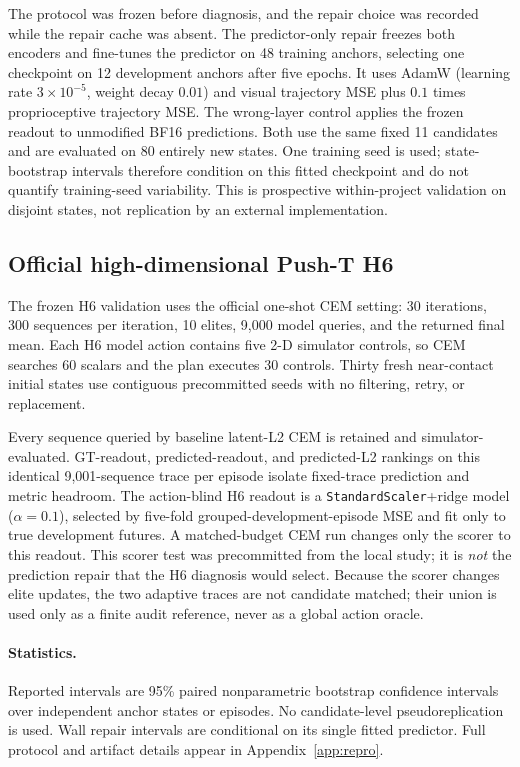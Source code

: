 The protocol was frozen before diagnosis, and the repair choice was recorded while the repair cache was absent. The predictor-only repair freezes both encoders and fine-tunes the predictor on 48 training anchors, selecting one checkpoint on 12 development anchors after five epochs. It uses AdamW (learning rate $3\times10^{-5}$, weight decay $0.01$) and visual trajectory MSE plus $0.1$ times proprioceptive trajectory MSE. The wrong-layer control applies the frozen readout to unmodified BF16 predictions. Both use the same fixed 11 candidates and are evaluated on 80 entirely new states. One training seed is used; state-bootstrap intervals therefore condition on this fitted checkpoint and do not quantify training-seed variability. This is prospective within-project validation on disjoint states, not replication by an external implementation.

\subsection{Official high-dimensional Push-T H6}

The frozen H6 validation uses the official one-shot CEM setting: 30 iterations, 300 sequences per iteration, 10 elites, 9,000 model queries, and the returned final mean. Each H6 model action contains five 2-D simulator controls, so CEM searches 60 scalars and the plan executes 30 controls. Thirty fresh near-contact initial states use contiguous precommitted seeds with no filtering, retry, or replacement.

Every sequence queried by baseline latent-L2 CEM is retained and simulator-evaluated. GT-readout, predicted-readout, and predicted-L2 rankings on this identical 9,001-sequence trace per episode isolate fixed-trace prediction and metric headroom. The action-blind H6 readout is a \texttt{StandardScaler}+ridge model ($\alpha=0.1$), selected by five-fold grouped-development-episode MSE and fit only to true development futures. A matched-budget CEM run changes only the scorer to this readout. This scorer test was precommitted from the local study; it is \emph{not} the prediction repair that the H6 diagnosis would select. Because the scorer changes elite updates, the two adaptive traces are not candidate matched; their union is used only as a finite audit reference, never as a global action oracle.

\paragraph{Statistics.}
Reported intervals are 95\% paired nonparametric bootstrap confidence intervals over independent anchor states or episodes. No candidate-level pseudoreplication is used. Wall repair intervals are conditional on its single fitted predictor. Full protocol and artifact details appear in Appendix~\ref{app:repro}.
